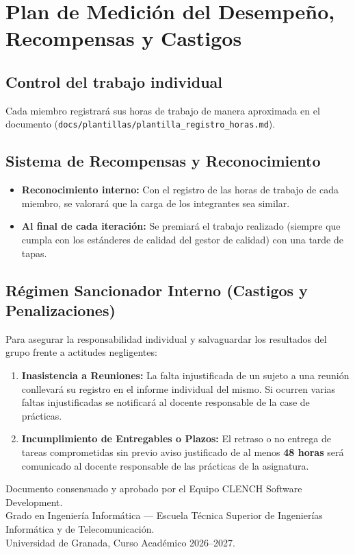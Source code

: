 \section{Plan de Medición del Desempeño, Recompensas y Castigos}

\subsection{Control del trabajo individual}
Cada miembro registrará sus horas de trabajo de manera aproximada en el documento (\texttt{docs/plantillas/plantilla\_registro\_horas.md}).

\subsection{Sistema de Recompensas y Reconocimiento}
\begin{itemize}[leftmargin=*]
  \item \textbf{Reconocimiento interno:} Con el registro de las horas de trabajo de cada miembro, se valorará que la carga de los integrantes sea similar.
  \item \textbf{Al final de cada iteración:} Se premiará el trabajo realizado (siempre que cumpla con los estánderes de calidad del gestor de calidad) con una tarde de tapas.
\end{itemize}

\subsection{Régimen Sancionador Interno (Castigos y Penalizaciones)}
Para asegurar la responsabilidad individual y salvaguardar los resultados del grupo frente a actitudes negligentes:
\begin{enumerate}[leftmargin=*]
  \item \textbf{Inasistencia a Reuniones:} La falta injustificada de un sujeto a una reunión conllevará su registro en el informe individual del mismo. Si ocurren varias faltas injustificadas se notificará al docente responsable de la case de prácticas.
  \item \textbf{Incumplimiento de Entregables o Plazos:} El retraso o no entrega de tareas comprometidas sin previo aviso justificado de al menos \textbf{48 horas} será comunicado al docente responsable de las prácticas de la asignatura.
\end{enumerate}

\vfill
\begin{center}
  \small\sffamily\color{textGray}
  Documento consensuado y aprobado por el Equipo CLENCH Software Development.\\
  Grado en Ingeniería Informática --- Escuela Técnica Superior de Ingenierías Informática y de Telecomunicación.\\
  Universidad de Granada, Curso Académico 2026--2027.
\end{center}
